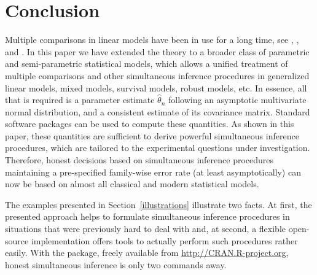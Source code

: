 \documentclass[12pt,a4paper]{article}
\begin{document}




\section{Conclusion}

Multiple comparisons in linear models have been in use for a long time, see 
\cite{HochbergTamhane1987}, \cite{Hsu1996}, and \cite{Bretzetal2008}. In
this paper we have extended the theory to a broader class of parametric and
semi-parametric statistical models, which allows a unified treatment of
multiple comparisons and other simultaneous inference procedures in
generalized linear models, mixed models, survival models, robust models, etc.
In essence, all that is required is a parameter estimate $\hat{\theta}_n$
following an asymptotic multivariate normal distribution, and a consistent
estimate of its covariance matrix. Standard software packages
can be used to compute these quantities. As shown in this paper, these
quantities are sufficient to derive powerful simultaneous inference
procedures, which are tailored to the experimental questions under
investigation. Therefore, honest decisions based on simultaneous inference
procedures maintaining a pre-specified family-wise error rate (at least
asymptotically) can now be
based on almost all classical and modern statistical models.

The examples presented in Section~\ref{illustrations} illustrate two facts.
At first, the presented approach helps to formulate simultaneous inference
procedures in situations that were previously hard to deal with and, at
second, a flexible open-source implementation offers tools to actually
perform such procedures rather easily. With the  package,
freely available from \url{http://CRAN.R-project.org}, honest simultaneous
inference is only two commands away. 



\end{document}
